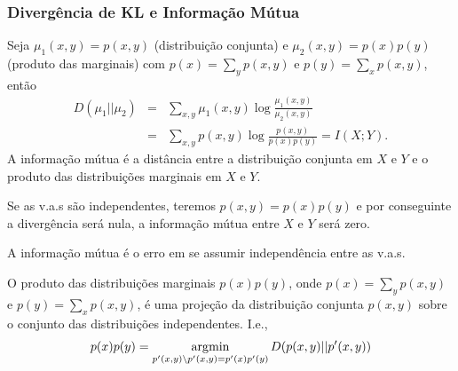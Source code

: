\begin{frame}[allowframebreaks]
  \frametitle{Divergência de KL e Informação Mútua}
  Seja $\mu_1(x,y) = p(x,y)$ (distribuição conjunta) e $\mu_2(x,y)=p(x)p(y)$ (produto das marginais) 
  com $p(x)=\sum_y p(x,y)$ e $p(y)=\sum_x p(x,y)$, então
  \begin{eqnarray}
  D(\mu_1 || \mu_2) &=& \sum_{x,y} \mu_1(x,y) \log \frac{\mu_1(x,y)}{\mu_2(x,y)} \nonumber \\
                &=& \sum_{x,y} p(x,y) \log \frac{p(x,y)}{p(x)p(y)} = I(X;Y) .
  \end{eqnarray}
  A informação mútua é a distância entre a distribuição conjunta em $X$ e $Y$ e o produto
  das distribuições marginais em $X$ e $Y$.

  Se as v.a.s são independentes, teremos $p(x,y)=p(x)p(y)$ e por conseguinte a divergência será nula,
  a informação mútua entre $X$ e $Y$ será zero.

  A informação mútua é o erro em se assumir independência entre as v.a.s.

  \framebreak
  O produto das distribuições marginais $p(x)p(y)$, onde $p(x)=\sum_y p(x,y)$ e $p(y)=\sum_x p(x,y)$,
  é uma projeção da distribuição conjunta $p(x,y)$ sobre o conjunto das distribuições independentes.
  I.e.,
  \begin{equation}
  p(x)p(y) = \operatorname*{\arg\!\min}_{p'(x,y) \backslash p'(x,y)=p'(x)p'(y)} D(p(x,y)||p'(x,y)) 
  \end{equation}
\end{frame}


